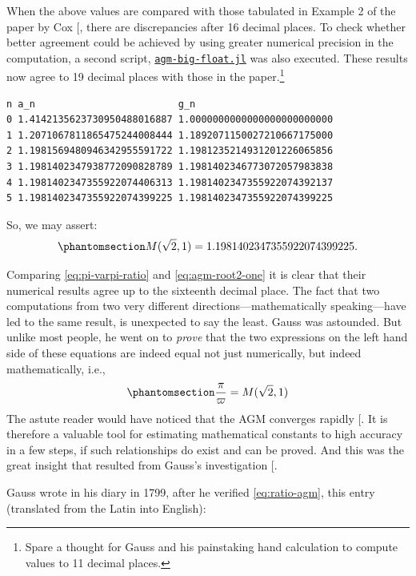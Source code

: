 \documentclass[
  a4paper,
]{article}
\begin{document}
When the above values are compared with those tabulated in Example 2 of
the paper by Cox {[}\citeproc{ref-cox-1984}{33}{]}, there are
discrepancies after 16 decimal places. To check whether better agreement
could be achieved by using greater numerical precision in the
computation, a second script,
\href{auxiliary/agm-big-float.jl}{\texttt{agm-big-float.jl}} was also
executed. These results now agree to 19 decimal places with those in the
paper.\footnote{Spare a thought for Gauss and his painstaking hand
  calculation to compute values to 11 decimal places.}

\begin{verbatim}
n a_n                         g_n
0 1.4142135623730950488016887 1.0000000000000000000000000
1 1.2071067811865475244008444 1.1892071150027210667175000
2 1.1981569480946342955591722 1.1981235214931201226065856
3 1.1981402347938772090828789 1.1981402346773072057983838
4 1.1981402347355922074406313 1.1981402347355922074392137
5 1.1981402347355922074399225 1.1981402347355922074399225
\end{verbatim}

So, we may assert:
\begin{equation}\phantomsection\label{eq:agm-root2-one}{
M(\sqrt{2}, 1) = 1.1981402347355922074399225.
}\end{equation}

Comparing \cref{eq:pi-varpi-ratio} and \cref{eq:agm-root2-one} it is
clear that their numerical results agree up to the sixteenth decimal
place. The fact that two computations from two very different
directions---mathematically speaking---have led to the same result, is
unexpected to say the least. Gauss was astounded. But unlike most
people, he went on to \emph{prove} that the two expressions on the left
hand side of these equations are indeed equal not just numerically, but
indeed mathematically, i.e.,
\begin{equation}\phantomsection\label{eq:ratio-agm}{
\frac{\pi}{\varpi} = M(\sqrt{2}, 1)
}\end{equation} The astute reader would have noticed that the AGM
converges rapidly {[}\citeproc{ref-pi-and-the-agm}{36}{]}. It is
therefore a valuable tool for estimating mathematical constants to high
accuracy in a few steps, if such relationships do exist and can be
proved. And this was the great insight that resulted from Gauss's
investigation {[}\citeproc{ref-pi-and-the-agm}{36}{]}.

Gauss wrote in his diary in 1799, after he verified \cref{eq:ratio-agm},
this entry (translated from the Latin into English):
\end{document}
